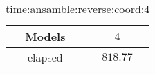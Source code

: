 \begin{table}[!ht]
	\centering
	\begin{tabular}{|c|c|}
		\hline
		Models & $4$ \\ \hline
		elapsed & $818.77$ \\ \hline
	\end{tabular}
	\caption{time:ansamble:reverse:coord:4}
	\label{tab:time:ansamble:reverse:coord:4}
\end{table}

